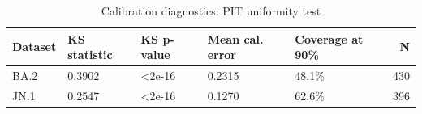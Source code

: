 \begin{table}[!h]
\centering
\caption{\label{tab:tab:calibration}Calibration diagnostics: PIT uniformity test}
\centering
\begin{tabular}[t]{lllllr}
\toprule
Dataset & KS statistic & KS p-value & Mean cal. error & Coverage at 90\% & N\\
\midrule
BA.2 & 0.3902 & <2e-16 & 0.2315 & 48.1\% & 430\\
JN.1 & 0.2547 & <2e-16 & 0.1270 & 62.6\% & 396\\
\bottomrule
\end{tabular}
\end{table}

